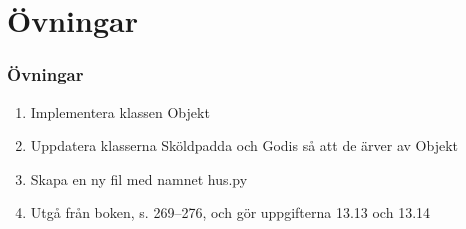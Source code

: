\documentclass[aspectratio=169]{beamer}
\begin{document}
\section{Övningar}


\begin{frame}
	\frametitle{Övningar}
	
	\begin{enumerate}
		\item Implementera klassen Objekt
		\item Uppdatera klasserna Sköldpadda och Godis så att de ärver av Objekt
		\item Skapa en ny fil med namnet hus.py
		\item Utgå från boken, s. 269--276, och gör uppgifterna 13.13 och 13.14 
	\end{enumerate}
	
\end{frame}
\end{document}
